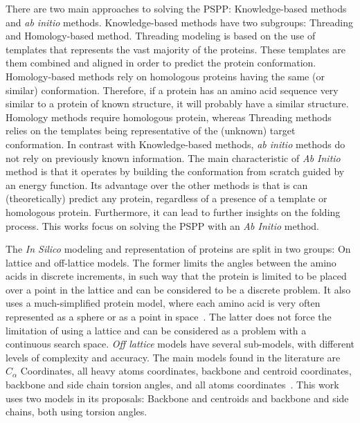 There are two main approaches to solving the \ac{PSPP}: Knowledge-based methods
and \textit{ab initio} methods. Knowledge-based methods have two subgroups:
Threading and Homology-based method. Threading modeling is based on the use of
templates that represents the vast majority of the proteins. These templates
are them combined and aligned in order to predict the protein conformation.
Homology-based methods rely on homologous proteins having the same (or similar)
conformation. Therefore, if a protein has an amino acid sequence very similar
to a protein of known structure, it will probably have a similar structure.
Homology methods require homologous protein, whereas Threading methods relies
on the templates being representative of the (unknown) target conformation. In
contrast with Knowledge-based methods, \textit{ab initio} methods do not rely
on previously known information. The main characteristic of \textit{Ab Initio}
method is that it operates by building the conformation from scratch guided by
an energy function. Its advantage  over the other
methods is that is can (theoretically) predict any protein, regardless of a
presence of a template or homologous protein. Furthermore, it can lead to
further insights on the folding process. This works focus on solving the
\ac{PSPP} with an \textit{Ab Initio} method.

The \textit{In Silico} modeling and representation of proteins are split in two
groups: On lattice and off-lattice models. The former limits the angles between
the amino acids in discrete increments, in such way that the protein is limited
to be placed over a point in the lattice and can be considered to be a discrete
problem. It also uses a much-simplified protein model, where each amino acid is
very often represented as a sphere or as a point in space~\cite{berger1998protein}.
The latter does not force the limitation of using a
lattice and can be considered as a problem with
a continuous search space. \textit{Off lattice} models have several
sub-models, with different levels of complexity and accuracy. The main models
found in the literature are $C_\alpha$ Coordinates, all heavy atoms
coordinates, backbone and centroid coordinates, backbone and side chain torsion
angles, and all atoms coordinates~\cite{dorn2014three,rohl2004protein}.
This work uses two models in its proposals: Backbone and centroids and backbone
and side chains, both using torsion angles.

